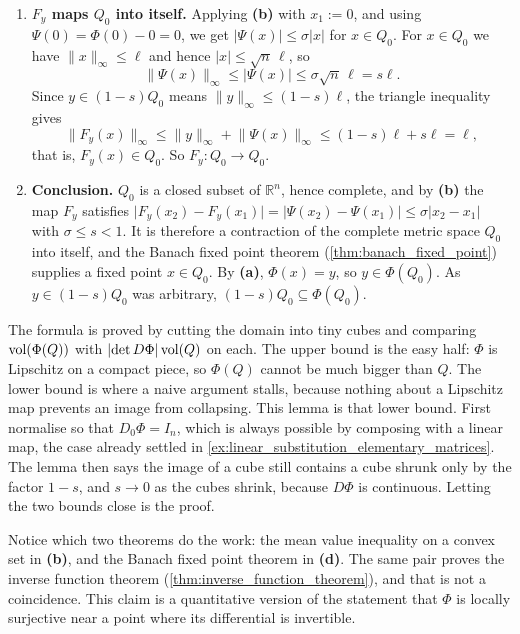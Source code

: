 \begin{example}
\begin{enumerate}[label=\textbf{(\alph*)}]
  \item \textbf{$F_y$ maps $Q_0$ into itself.} Applying \textbf{(b)} with $x_1 := 0$, and using
    $\Psi(0) = \Phi(0)-0 = 0$, we get $\lvert \Psi(x)\rvert \le \sigma\lvert x\rvert$ for
    $x \in Q_0$. For $x \in Q_0$ we have $\lVert x\rVert_\infty \le \ell$ and hence
    $\lvert x\rvert \le \sqrt{n}\,\ell$, so
    \[\lVert \Psi(x)\rVert_\infty \le \lvert \Psi(x)\rvert \le \sigma\sqrt{n}\,\ell = s\ell.\]
    Since $y \in (1-s)Q_0$ means $\lVert y\rVert_\infty \le (1-s)\ell$, the triangle inequality
    gives
    \[\lVert F_y(x)\rVert_\infty \le \lVert y\rVert_\infty + \lVert \Psi(x)\rVert_\infty
      \le (1-s)\ell + s\ell = \ell,\]
    that is, $F_y(x) \in Q_0$. So $F_y : Q_0 \to Q_0$.

  \item \textbf{Conclusion.} $Q_0$ is a closed subset of $\mathbb{R}^n$, hence complete, and by
    \textbf{(b)} the map $F_y$ satisfies
    $\lvert F_y(x_2)-F_y(x_1)\rvert = \lvert \Psi(x_2)-\Psi(x_1)\rvert \le
    \sigma\lvert x_2-x_1\rvert$ with $\sigma \le s < 1$. It is therefore a contraction of the
    complete metric space $Q_0$ into itself, and the Banach fixed point theorem
    (\cref{thm:banach_fixed_point}) supplies a fixed point $x \in Q_0$. By \textbf{(a)},
    $\Phi(x) = y$, so $y \in \Phi(Q_0)$. As $y \in (1-s)Q_0$ was arbitrary,
    $(1-s)Q_0 \subseteq \Phi(Q_0)$.
\end{enumerate}

\begin{remark}
The formula is proved by cutting the domain into tiny cubes and comparing $\operatorname{vol}(\Phi(Q))$ with
$\lvert\det D\Phi\rvert\operatorname{vol}(Q)$ on each. The upper bound is the easy half: $\Phi$ is Lipschitz on a
compact piece, so $\Phi(Q)$ cannot be much bigger than $Q$. The lower bound is where a naive
argument stalls, because nothing about a Lipschitz map prevents an image from collapsing. This
lemma is that lower bound. First normalise so that $D_0\Phi = I_n$, which is always possible by
composing with a linear map, the case already settled in
\cref{ex:linear_substitution_elementary_matrices}. The lemma then says the image of a cube still
contains a cube shrunk only by the factor $1-s$, and $s \to 0$ as the cubes shrink, because
$D\Phi$ is continuous. Letting the two bounds close is the proof.

Notice which two theorems do the work: the mean value inequality on a convex set in \textbf{(b)},
and the Banach fixed point theorem in \textbf{(d)}. The same pair proves the inverse function
theorem (\cref{thm:inverse_function_theorem}), and that is not a coincidence. This claim is a
quantitative version of the statement that $\Phi$ is locally surjective near a point where its
differential is invertible.
\end{remark}
\end{example}


